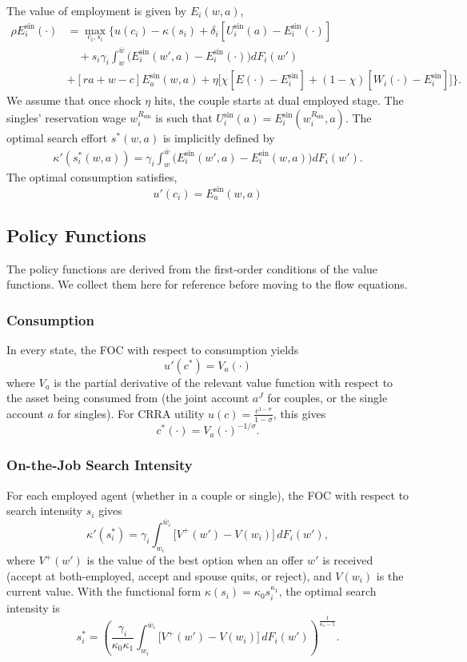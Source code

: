 \documentclass{article}
\begin{document}
The value of employment is given by $E_i(w,a)$,
\begin{align*}
    \rho E_i^\text{sin}(\cdot)&=\max_{c_i, s_i} \bigg\{ u(c_i)-\kappa(s_i)+\delta_i[U_i^\text{sin}(a)-E_i^\text{sin}(\cdot)]\\&\quad+s_i\gamma_i\int_{w}^{\overline{w}}\big(E_i^\text{sin}(w',a)-E_i^\text{sin}(\cdot)\big)dF_i(w')\\& + [ra + w - c]E_a^\text{sin}(w,a) + \eta \Big[\chi [E(\cdot) - E_i^\text{sin}] +(1-\chi)[W_{i}(\cdot)-E_i^\text{sin}]\Big]\bigg\}.
\end{align*}
We assume that once shock $\eta$ hits, the couple starts at dual employed stage. The singles' reservation wage $w_i^{R_\text{sin}}$ is such that $U_i^\text{sin}(a)=E_i^\text{sin}(w_i^{R_\text{sin}},a)$. The optimal search effort $s^*(w,a)$ is implicitly defined by \begin{align*}
    \kappa'(s_i^*(w,a))=\gamma_i\int_{w}^{\overline{w}}\big(E_i^\text{sin}(w',a)-E_i^\text{sin}(w,a)\big)dF_i(w').
\end{align*}
The optimal consumption satisfies,
\[
u'(c_i) = E_a^\text{sin}(w,a)
\]
\subsection{Policy Functions}

The policy functions are derived from the first-order conditions of the value functions. We collect them here for reference before moving to the flow equations.

\subsubsection*{Consumption}
In every state, the FOC with respect to consumption yields
\[
    u'(c^*) = V_a(\cdot)
\]
where $V_a$ is the partial derivative of the relevant value function with respect to the asset being consumed from (the joint account $a^J$ for couples, or the single account $a$ for singles). For CRRA utility $u(c) = \frac{c^{1-\sigma}}{1-\sigma}$, this gives
\[
    c^*(\cdot) = V_a(\cdot)^{-1/\sigma}.
\]

\subsubsection*{On-the-Job Search Intensity}
For each employed agent (whether in a couple or single), the FOC with respect to search intensity $s_i$ gives
\[
    \kappa'(s_i^*) = \gamma_i \int_{w_i}^{\overline{w}_i} \bigl[V^+(w') - V(w_i)\bigr] \, dF_i(w'),
\]
where $V^+(w')$ is the value of the best option when an offer $w'$ is received (accept at both-employed, accept and spouse quits, or reject), and $V(w_i)$ is the current value. With the functional form $\kappa(s_i) = \kappa_0 s_i^{\kappa_1}$, the optimal search intensity is
\[
    s_i^* = \left(\frac{\gamma_i}{\kappa_0 \kappa_1} \int_{w_i}^{\overline{w}_i} \bigl[V^+(w') - V(w_i)\bigr] \, dF_i(w')\right)^{\!\frac{1}{\kappa_1 - 1}}.
\]
\end{document}
